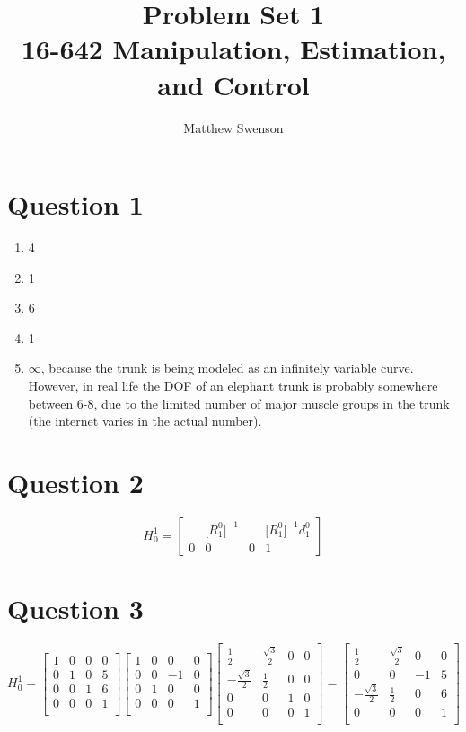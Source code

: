 \documentclass[11pt]{article}
\title{Problem Set 1\\ \vspace{2mm}\Large{16-642 Manipulation, Estimation, and Control}}
\author{Matthew Swenson}
\begin{document}
	\maketitle
	
\section{Question 1}
\begin{enumerate}[label=\Alph*]
    \item 4
    \item 1
    \item 6
    \item 1
    \item $\infty$, because the trunk is being modeled as an infinitely variable curve. However, in real life the DOF of an elephant trunk is probably somewhere between 6-8, due to the limited number of major muscle groups in the trunk (the internet varies in the actual number). 
\end{enumerate}
\section{Question 2}
$$
H^1_0 =
\begin{bmatrix}
    &\big[R^0_1\big]^{ -1 }& & \big[R^0_1\big]^{ -1 } d^0_1  \\
    0 & 0 & 0 & 1
\end{bmatrix}
$$

\section{Question 3}
$$
H^1_0 =
\begin{bmatrix}
    1 & 0 & 0 & 0 \\
    0 & 1 & 0 & 5 \\
    0 & 0 & 1 & 6 \\
    0 & 0 & 0 & 1 \\
\end{bmatrix}
\begin{bmatrix}
    1 & 0 & 0 & 0 \\
    0 & 0 & -1& 0 \\
    0 & 1 & 0 & 0 \\
    0 & 0 & 0 & 1 \\
\end{bmatrix}      
\begin{bmatrix}
    \frac{1}{2} & \frac{\sqrt{3}}{2} & 0 & 0 \\
    -\frac{\sqrt{3}}{2}  & \frac{1}{2} & 0 & 0 \\
    0 & 0 & 1 & 0 \\
    0 & 0 & 0 & 1 \\
\end{bmatrix}
=
\begin{bmatrix}
    \frac{1}{2} & \frac{\sqrt{3}}{2} & 0 & 0 \\
    0 & 0 & -1 & 5 \\
    -\frac{\sqrt{3}}{2}  & \frac{1}{2} & 0 & 6 \\
    0 & 0 & 0 & 1 \\
\end{bmatrix}
$$
\end{document}

